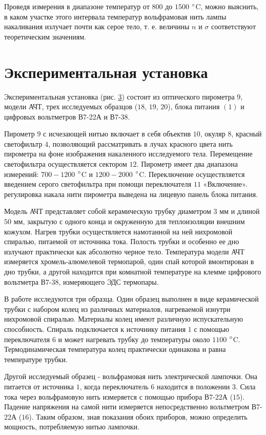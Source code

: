 \documentclass[a4paper,12pt]{article}
\begin{document}
Проведя измерения в диапазоне температур от $800$ до $1500$ $\degree$C, можно выяснить, в каком участке этого интервала температур вольфрамовая нить лампы накаливания излучает почти как серое тело, т. е. величины $n$ и $\sigma$ соответствуют теоретическим значениям.

\section{Экспериментальная установка}
Экспериментальная установка (рис. \hyperref[fig: Exp setup]{3}) состоит из оптического пирометра $9$, модели АЧТ, трех исследуемых образцов ($18$, $19$, $20$), блока питания $(1)$ и цифровых вольтметров В7-22А и В7-38.

Пирометр $9$ с исчезающей нитью включает в себя объектив $10$, окуляр $8$, красный светофильтр $4$, позволяющий рассматривать в лучах красного цвета нить пирометра на фоне изображения накаленного исследуемого тела. Перемещение светофильтра осуществляется сектором $12$. Пирометр имеет два диапазона измерений: $700-1200$ $\degree$C и $1200-2000$ $\degree$C. Переключение осуществляется введением серого светофильтра при помощи переключателя $11$ «Включение». регулировка накала нити пирометра выведена на лицевую панель блока питания.

Модель АЧТ представляет собой керамическую трубку диаметром $3$ мм и длиной $50$ мм, закрытую с одного конца и окруженную для теплоизоляции внешним кожухом. Нагрев трубки осуществляется намотанной на ней нихромовой спиралью, питаемой от источника тока. Полость трубки и особенно ее дно излучают практически как абсолютно черное тело. Температура модели АЧТ измеряется хромель-алюмелевой термопарой, один спай которой вмонтирован в дно трубки, а другой находится при комнатной температуре на клемме цифрового вольтметра В7-38, измеряющего ЭДС термопары.

В работе исследуются три образца. Один образец выполнен в виде керамической трубки с набором колец из различных материалов,
нагреваемой изнутри нихромовой спиралью. Материалы колец имеют различную испускательную способность. Спираль подключается к источнику питания $1$ с помощью переключателя $6$ и может нагревать трубку до температуры около $1100$ $\degree$C. Термодинамическая температура колец практически одинакова и равна температуре трубки.

Другой исследуемый образец - вольфрамовая нить электрической лампочки. Она питается от источника $1$, когда переключатель $6$ находится в положении $3$. Сила тока через вольфрамовую нить измеряется с помощью прибора В7-22А ($15$). Падение напряжения на самой нити измеряется непосредственно вольтметром В7-22А ($16$). Таким образом, зная показания обоих приборов, можно определить мощность, потребляемую нитью лампочки.
\end{document}
